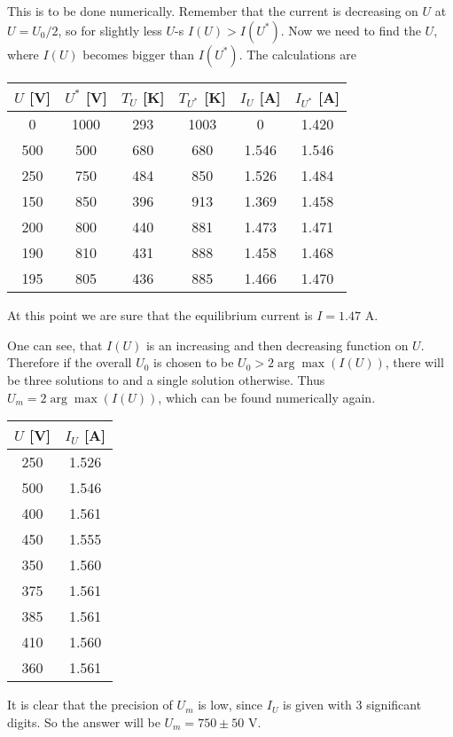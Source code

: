 This is to be done numerically.
Remember that the current is decreasing on $U$ at $U = U_0 / 2$,
so for slightly less $U$-s $I(U) > I(U^*)$.
Now we need to find the $U$, where $I(U)$ becomes bigger than $I(U^*)$.
The calculations are
\begin{center}
    \begin{tabular}{ c | c | c | c | c | c}
    $U$ [V]  & $U^*$ [V] & $T_U$ [K] & $T_{U^*}$ [K] & $I_U$ [A] & $I_{U^*}$ [A] \\
    \hline
    0     & 1000 & 293 & 1003 & 0     & 1.420 \\
    500   & 500  & 680 & 680  & 1.546 & 1.546 \\
    250   & 750  & 484 & 850  & 1.526 & 1.484 \\
    150   & 850  & 396 & 913  & 1.369 & 1.458 \\
    \rowcolor{yellow}
    200   & 800  & 440 & 881  & 1.473 & 1.471 \\
    190   & 810  & 431 & 888  & 1.458 & 1.468 \\
    \rowcolor{yellow}
    195   & 805  & 436 & 885  & 1.466 & 1.470 \\
    \end{tabular}
\end{center}
At this point we are sure that the equilibrium current is $I = 1.47 \text{ A}$.

One can see, that $I(U)$ is an increasing and then decreasing function on $U$.
Therefore if the overall $U_0$ is chosen to be $U_0 > 2\arg\max(I(U))$,
there will be three solutions to  and a single solution otherwise.
Thus $U_m = 2 \arg\max(I(U))$, which can be found numerically again.

\begin{center}
    \begin{tabular}{ c | c }
    $U$ [V] & $I_U$ [A] \\
    \hline
    250 & 1.526 \\
    500 & 1.546 \\
    400 & 1.561 \\
    450 & 1.555 \\
    350 & 1.560 \\
    375 & 1.561 \\
    385 & 1.561 \\
    410 & 1.560 \\
    360 & 1.561 \\
    \end{tabular}
\end{center}

It is clear that the precision of $U_m$ is low,
since $I_U$ is given with 3 significant digits.
So the answer will be $U_m = 750 \pm 50 \text{ V}$.
